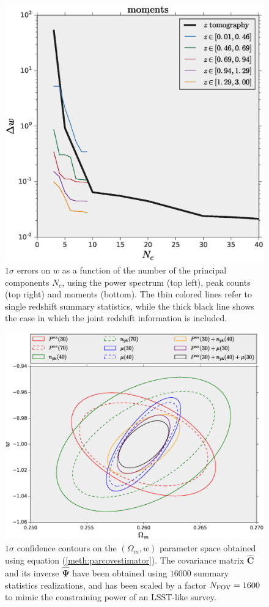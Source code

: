 \documentclass[reprint,aps,prd,superscriptaddress,showkeys,showpacs]{revtex4-1}
\newcommand{\bbh}[1]{\mathbf{\hat{#1}}}
\begin{document}
\begin{figure}
\includegraphics[scale=0.3]{Figures/w_moments_pca.eps}
\caption{$1\sigma$ errors on $w$ as a function of the number of the principal components $N_c$, using the power spectrum (top left), peak counts (top right) and moments (bottom). The thin colored lines refer to single redshift summary statistics, while the thick black line shows the case in which the joint redshift information is included.}
\label{fig:pcacomponents}
\end{figure}


\begin{figure}
\includegraphics[scale=0.3]{Figures/constraints.eps}
\caption{$1\sigma$ confidence contours on the $(\Omega_m,w)$ parameter space obtained using equation (\ref{meth:parcovestimator}). The covariance matrix $\bbh{C}$ and its inverse $\bbh{\Psi}$ have been obtained using $16000$ summary statistics realizations, and has been scaled by a factor $N_{\rm FOV}=1600$ to mimic the constraining power of an LSST-like survey.}
\label{fig:constraintsOm-w}
\end{figure}
\end{document}
